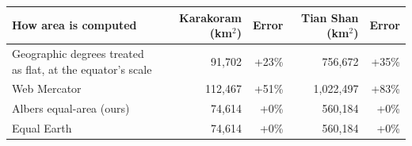 \begin{tabular}{p{5.2cm}rrrr}
\toprule
How area is computed & Karakoram (km$^2$) & Error & Tian Shan (km$^2$) & Error \\
\midrule
Geographic degrees treated as flat{,} at the equator's scale & 91{,}702 & +23\% & 756{,}672 & +35\% \\
Web Mercator & 112{,}467 & +51\% & 1{,}022{,}497 & +83\% \\
Albers equal-area (ours) & 74{,}614 & +0\% & 560{,}184 & +0\% \\
Equal Earth & 74{,}614 & +0\% & 560{,}184 & +0\% \\
\bottomrule
\end{tabular}
